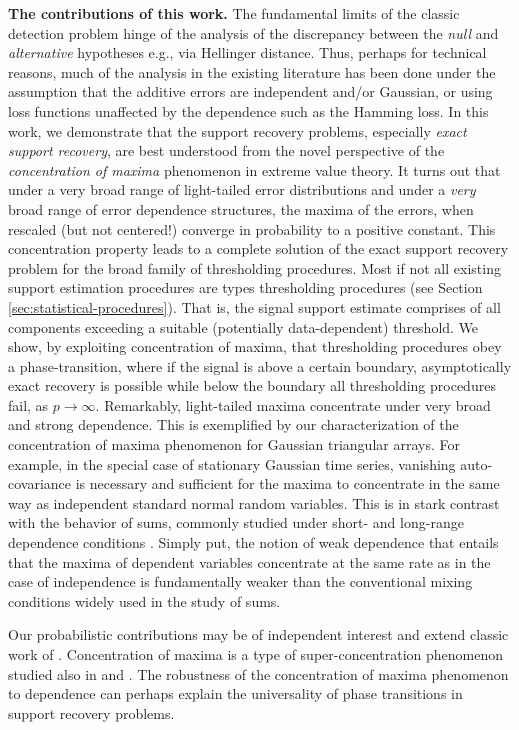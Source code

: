      
{\bf The contributions of this work.} The fundamental limits of the classic detection problem hinge 
of the analysis of the discrepancy between the {\em null} and {\em alternative} hypotheses e.g., via Hellinger distance.  Thus, perhaps 
for  technical reasons, much of the analysis in the existing literature has been done under the assumption that the additive errors are 
independent and/or Gaussian, or using loss functions unaffected by the dependence such as the Hamming loss.  
In this work, we demonstrate that the support recovery problems, especially {\em exact support recovery}, are best understood from 
the novel perspective of the {\em concentration of maxima} phenomenon in extreme value theory.  It turns out that under a very broad 
range of light-tailed error distributions and under a {\em very} broad range of error dependence structures, the maxima of the errors, 
when rescaled (but not centered!) converge in probability to a positive constant. This concentration property leads to a complete solution 
of the exact  support recovery problem for the broad family of thresholding procedures.  Most if not all existing support estimation 
procedures are types thresholding procedures (see Section \ref{sec:statistical-procedures}).   
That is, the signal support estimate comprises of all components exceeding a suitable (potentially data-dependent)  threshold.  We show, by exploiting concentration of maxima, that thresholding procedures obey a phase-transition, where if the signal is above a 
certain boundary, asymptotically exact recovery is possible while below the boundary all thresholding procedures fail, as $p\to\infty$.  
Remarkably, light-tailed maxima concentrate under very broad and strong dependence.  This is exemplified by our characterization of
the concentration of maxima phenomenon for Gaussian triangular arrays.  For example, in the special case of stationary Gaussian time
series, vanishing auto-covariance is necessary and sufficient for the maxima to concentrate in the same way as independent standard 
normal random variables.  This is in stark contrast with the behavior of sums, commonly studied under short- and long-range dependence conditions \citep[see e.g.][]{dedecker:doukhan:etal:2007,pipiras:taqqu:2017}.  Simply put, the notion of weak dependence that entails that the maxima of dependent variables concentrate at the
same rate as in the case of independence is fundamentally weaker than the conventional mixing conditions widely used in the study of sums.

Our probabilistic contributions may be of independent interest and extend classic work of \cite{berman1964limit}. 
Concentration of maxima is a type of super-concentration phenomenon studied also in \cite{chatterjee2014superconcentration} 
and \cite{tanguy:2015}. The robustness of the concentration of maxima phenomenon to dependence can perhaps explain the universality 
of phase transitions in support recovery problems. 

